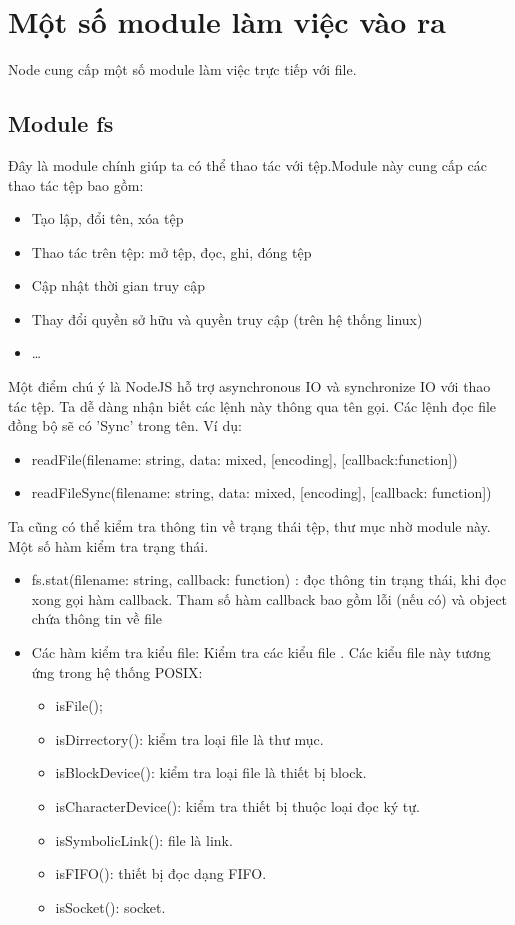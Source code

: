﻿

\section{Một số module làm việc vào ra}
		Node cung cấp một số module làm việc trực tiếp với file.
	\subsection{Module fs}
		Đây là module chính giúp ta có thể thao tác với tệp.Module này cung cấp các thao tác tệp bao gồm:
		\begin{itemize}
			\item Tạo lập, đổi tên, xóa tệp 
			\item Thao tác trên tệp: mở tệp, đọc, ghi, đóng tệp 
			\item Cập nhật thời gian truy cập
			\item Thay đổi quyền sở hữu và quyền truy cập (trên hệ thống linux)
			\item …
		\end{itemize}
		
		Một điểm chú ý là NodeJS hỗ trợ asynchronous IO và synchronize IO với thao tác tệp. Ta dễ dàng nhận biết các lệnh này thông qua tên gọi. Các lệnh đọc file đồng bộ sẽ có 'Sync' trong tên. Ví dụ:
		\begin{itemize}
			\item readFile(filename: string, data: mixed, [encoding], [callback:function])
			\item readFileSync(filename: string, data: mixed, [encoding], [callback: function])
		\end{itemize}
		
		Ta cũng có thể kiểm tra thông tin về trạng thái tệp, thư mục nhờ module này. Một số hàm kiểm tra trạng thái. 
		\begin{itemize}
			\item fs.stat(filename: string, callback: function) : đọc thông tin trạng thái, khi đọc xong gọi hàm callback. Tham số hàm callback bao gồm lỗi (nếu có) và object chứa thông tin về file
			\item Các hàm kiểm tra kiểu file: Kiểm tra các kiểu file . Các kiểu file này tương ứng trong hệ thống POSIX:
			\begin{itemize}
				\item isFile();
				\item isDirrectory(): kiểm tra loại file là thư mục.
				\item isBlockDevice(): kiểm tra loại file là thiết bị block.
				\item isCharacterDevice(): kiểm tra thiết bị thuộc loại đọc ký tự.
				\item isSymbolicLink(): file là link.
				\item isFIFO(): thiết bị đọc dạng FIFO.
				\item isSocket(): socket.
			\end{itemize}
			
		\end{itemize}

